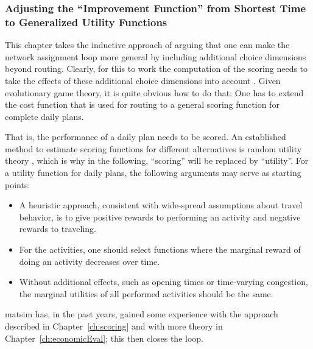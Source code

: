 


\subsubsection{Adjusting the ``Improvement Function'' from Shortest
Time to Generalized Utility Functions}
\label{sec:adjust-impr-funct}

\def\perf{{\it perf}}


This chapter takes the inductive approach of arguing that one can make
the network assignment loop more general by including additional
choice dimensions beyond routing.  Clearly, for this to work the
computation of the scoring needs to take the effects of these
additional choice dimensions into account \citep[also
  see][]{Balmer2007phd}.  Given evolutionary game theory, it is quite
obvious how to do that: One has to extend the cost
function that is used for routing to a general scoring function for
complete daily plans.


That is, the performance of a daily plan needs to be scored.  An
established method to estimate scoring functions for different
alternatives is random utility theory \citep[e.g.][]{ben-akiva-1985},
which is why in the following, ``scoring'' will be replaced by
``utility''.  For a utility function for daily plans, the following
arguments may serve as starting points:
\begin{itemize}

\item A heuristic approach, consistent with wide-spread assumptions
  about travel behavior, is to give positive rewards to performing an
  activity and negative rewards to traveling.

\item For the activities, one should select functions where the
  marginal reward of doing an activity decreases over time.

\item Without additional effects, such as opening times or
  time-varying congestion, the marginal utilities of all performed
  activities should be the same.  

\end{itemize}
\gls{matsim} has, in the past years, gained some experience with the approach 
described in Chapter~\ref{ch:scoring} and with more theory in 
Chapter~\ref{ch:economicEval}; this then closes the loop.  


